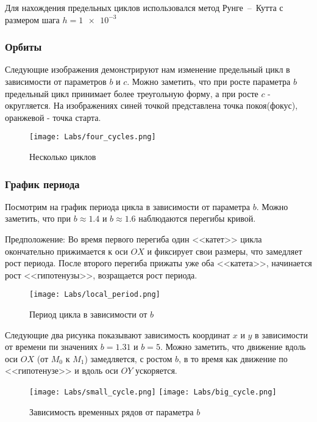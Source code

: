 \documentclass[a4paper,14pt]{extarticle}
\begin{document}
Для нахождения предельных циклов использовался метод Рунге~--~Кутта с размером шага $h = \num{1e-3}$


\newpage
\subsubsection{Орбиты}
Следующие изображения демонстрируют нам изменение предельный цикл в зависимости от параметров $b$ и  $c$. Можно заметить, что при росте параметра $b$ предельный цикл принимает более треугольную форму, а при росте $c$ - округляется. 
На изображениях синей точкой представлена точка покоя(фокус), оранжевой - точка старта.
\begin{figure}[!h]
\centering
\texttt{[image: Labs/four\_cycles.png]}
\caption{Несколько циклов}
\label{cycles}
\end{figure}

\newpage
\subsubsection{График периода}
Посмотрим на график периода цикла в зависимости от параметра $b$. Можно заметить, что при $b \approx 1.4$ и $b \approx 1.6$ наблюдаются перегибы кривой. 

Предположение: Во время первого перегиба один <<катет>> цикла окончательно прижимается к оси $OX$ и фиксирует свои размеры, что замедляет рост периода. После второго перегиба прижаты уже оба <<катета>>, начинается рост <<гипотенузы>>, возращается рост периода.

\begin{figure}[!h]
\texttt{[image: Labs/local\_period.png]}
\caption{Период цикла в зависимости от $b$}
\label{cyclesPeriod1}
\end{figure}

\newpage
Следующие два рисунка показывают зависимость координат $x$ и $y$ в зависимости от времени пи значениях $b = 1.31$ и $b = 5$.
Можно заметить, что движение вдоль оси $OX$ (от $M_0$ к $M_1$) замедляется, с ростом $b$, в то время как движение по <<гипотенузе>> и вдоль оси $OY$ ускоряется.
\begin{figure}[!h]
\centering
\texttt{[image: Labs/small\_cycle.png]}
\endminipage
{}
\texttt{[image: Labs/big\_cycle.png]}
\endminipage
\caption{Зависимость временных рядов от параметра $b$}
\label{cyclesPeriod2}
\end{figure}
\end{document}
